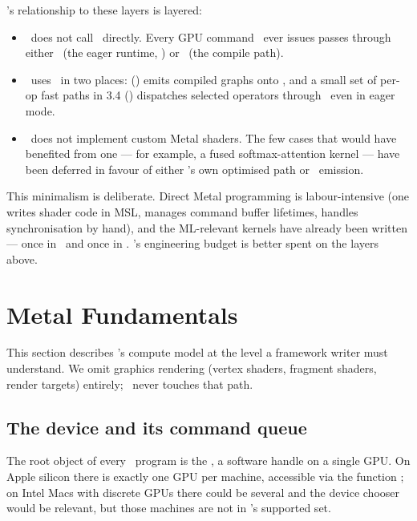 \Lucid's relationship to these layers is layered:

\begin{itemize}
  \item \Lucid\ does not call \Metal\ directly. Every GPU command
    \Lucid\ ever issues passes through either \MLX\ (the eager
    runtime, ) or \MPSGraph\ (the compile
    path).
  \item \Lucid\ uses \MPSGraph\ in two places: 
    () emits compiled graphs onto
    \MPSGraph, and a small set of per-op fast paths in 3.4
    () dispatches selected operators
    through \MPSGraph\ even in eager mode.
  \item \Lucid\ does not implement custom Metal shaders. The few
    cases that would have benefited from one --- for example, a
    fused softmax-attention kernel --- have been deferred in favour
    of either \MLX's own optimised path or \MPSGraph\ emission.
\end{itemize}

This minimalism is deliberate. Direct Metal programming is
labour-intensive (one writes shader code in MSL, manages command
buffer lifetimes, handles synchronisation by hand), and the
ML-relevant kernels have already been written --- once in \MLX\ and
once in \MPSGraph. \Lucid's engineering budget is better spent on
the layers above.

\section{Metal Fundamentals}
\label{sec:metal_mpsgraph:metal_fundamentals}

This section describes \Metal's compute model at the level a
framework writer must understand. We omit graphics rendering (vertex
shaders, fragment shaders, render targets) entirely; \Lucid\ never
touches that path.

\subsection{The device and its command queue}
\label{ssec:metal_mpsgraph:device_queue}

The root object of every \Metal\ program is the
, a software handle on a single GPU. On Apple
silicon there is exactly one GPU per machine, accessible via the
function ; on Intel Macs with
discrete GPUs there could be several and the device chooser would
be relevant, but those machines are not in \Lucid's supported set.


